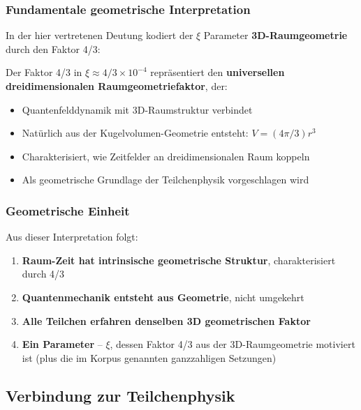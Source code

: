 	\subsubsection{Fundamentale geometrische Interpretation}
	\label{subsubsec:fundamentale_interpretation}
	
	In der hier vertretenen Deutung kodiert der $\xi$ Parameter \textbf{3D-Raumgeometrie} durch den Faktor 4/3:
	
	\begin{tcolorbox}[colback=yellow!5!white,colframe=orange!75!black,title=Dreidimensionaler Raumgeometriefaktor]
		Der Faktor 4/3 in $\xi \approx 4/3 \times 10^{-4}$ repräsentiert den \textbf{universellen dreidimensionalen Raumgeometriefaktor}, der:
		\begin{itemize}
			\item Quantenfelddynamik mit 3D-Raumstruktur verbindet
			\item Natürlich aus der Kugelvolumen-Geometrie entsteht: $V = (4\pi/3)r^3$
			\item Charakterisiert, wie Zeitfelder an dreidimensionalen Raum koppeln
			\item Als geometrische Grundlage der Teilchenphysik vorgeschlagen wird
		\end{itemize}
	\end{tcolorbox}
	
	\subsubsection{Geometrische Einheit}
	\label{subsubsec:geometrische_einheit}
	
	Aus dieser Interpretation folgt:
	\begin{enumerate}
		\item \textbf{Raum-Zeit hat intrinsische geometrische Struktur}, charakterisiert durch 4/3
		\item \textbf{Quantenmechanik entsteht aus Geometrie}, nicht umgekehrt
		\item \textbf{Alle Teilchen erfahren denselben 3D geometrischen Faktor}
		\item \textbf{Ein Parameter} -- $\xi$, dessen Faktor 4/3 aus der 3D-Raumgeometrie motiviert ist (plus die im Korpus genannten ganzzahligen Setzungen)
	\end{enumerate}
	
	\subsection{Verbindung zur Teilchenphysik}
	\label{subsec:verbindung_teilchenphysik}
	
